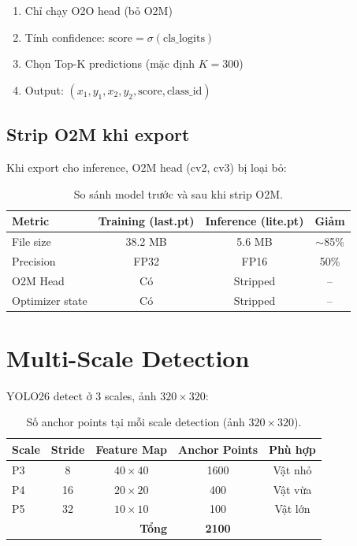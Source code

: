 \begin{enumerate}
    \item Chỉ chạy O2O head (bỏ O2M)
    \item Tính confidence: $\text{score} = \sigma(\text{cls\_logits})$
    \item Chọn Top-K predictions (mặc định $K=300$)
    \item Output: $(x_1, y_1, x_2, y_2, \text{score}, \text{class\_id})$
\end{enumerate}

\subsection{Strip O2M khi export}

Khi export cho inference, O2M head (cv2, cv3) bị loại bỏ:

\begin{table}[H]
\centering
\begin{tabular}{lccc}
\toprule
\textbf{Metric} & \textbf{Training (last.pt)} & \textbf{Inference (lite.pt)} & \textbf{Giảm} \\
\midrule
File size & 38.2 MB & 5.6 MB & $\sim$85\% \\
Precision & FP32 & FP16 & 50\% \\
O2M Head & Có & Stripped & -- \\
Optimizer state & Có & Stripped & -- \\
\bottomrule
\end{tabular}
\caption{So sánh model trước và sau khi strip O2M.}
\label{tab:strip_o2m}
\end{table}

\section{Multi-Scale Detection}
\label{sec:multiscale}

YOLO26 detect ở 3 scales, ảnh $320\times320$:

\begin{table}[H]
\centering
\begin{tabular}{lcccc}
\toprule
\textbf{Scale} & \textbf{Stride} & \textbf{Feature Map} & \textbf{Anchor Points} & \textbf{Phù hợp} \\
\midrule
P3 & 8  & $40\times40$  & 1600 & Vật nhỏ \\
P4 & 16 & $20\times20$  & 400  & Vật vừa \\
P5 & 32 & $10\times10$  & 100  & Vật lớn \\
\midrule
\multicolumn{3}{r}{\textbf{Tổng}} & \textbf{2100} & \\
\bottomrule
\end{tabular}
\caption{Số anchor points tại mỗi scale detection (ảnh $320\times320$).}
\label{tab:anchors}
\end{table}
